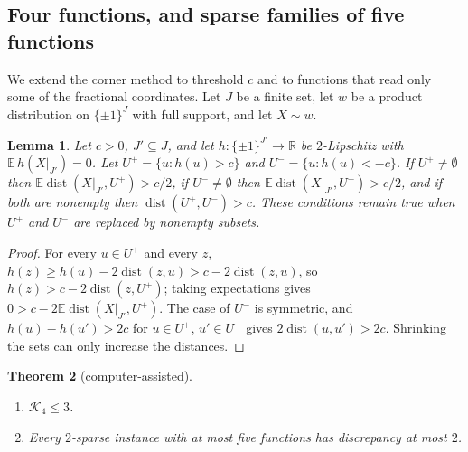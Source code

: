 \documentclass[11pt,letterpaper]{article}
\newtheorem{theorem}{Theorem}[section]
\newtheorem{lemma}[theorem]{Lemma}
\theoremstyle{definition}
\newcommand{\R}{\mathbb{R}}
\newcommand{\E}{\mathbb{E}}
\newcommand{\cube}[1]{\{\pm1\}^{#1}}
\DeclareMathOperator{\dist}{dist}
\begin{document}
\subsection{Four functions, and sparse families of five functions}\label{sec:k4}

We extend the corner method to threshold $c$ and to functions that read only some of the
fractional coordinates. Let $J$ be a finite set, let $w$ be a product distribution on $\cube J$
with full support, and let $X\sim w$.

\begin{lemma}\label{lem:necessaryc}
Let $c>0$, $J'\subseteq J$, and let $h\colon\cube{J'}\to\R$ be $2$-Lipschitz with
$\E\,h(X|_{J'})=0$. Let $U^+=\{u:h(u)>c\}$ and $U^-=\{u:h(u)<-c\}$. If $U^+\ne\emptyset$ then
$\E\dist(X|_{J'},U^+)>c/2$, if $U^-\ne\emptyset$ then $\E\dist(X|_{J'},U^-)>c/2$, and if both are
nonempty then $\dist(U^+,U^-)>c$. These conditions remain true when $U^+$ and $U^-$ are replaced by
nonempty subsets.
\end{lemma}

\begin{proof}
For every $u\in U^+$ and every $z$, $h(z)\ge h(u)-2\dist(z,u)>c-2\dist(z,u)$, so
$h(z)>c-2\dist(z,U^+)$; taking expectations gives $0>c-2\E\dist(X|_{J'},U^+)$. The case of $U^-$ is
symmetric, and $h(u)-h(u')>2c$ for $u\in U^+$, $u'\in U^-$ gives $2\dist(u,u')>2c$. Shrinking the
sets can only increase the distances.
\end{proof}

\begin{theorem}[computer-assisted]\label{thm:H}
\begin{enumerate}[label=(\alph*),itemsep=0pt]
\item $\mathcal{K}_4\le3$.
\item Every $2$-sparse instance with at most five functions has discrepancy at most $2$.
\end{enumerate}
\end{theorem}
\end{document}
